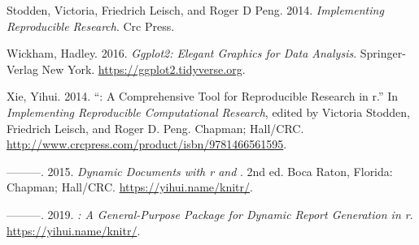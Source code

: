 \begin{CSLReferences}{1}{0}
\leavevmode{}%
Stodden, Victoria, Friedrich Leisch, and Roger D Peng. 2014. \emph{Implementing Reproducible Research}. Crc Press.

\leavevmode{}%
Wickham, Hadley. 2016. \emph{Ggplot2: Elegant Graphics for Data Analysis}. Springer-Verlag New York. \url{https://ggplot2.tidyverse.org}.

\leavevmode{}%
Xie, Yihui. 2014. {``: A Comprehensive Tool for Reproducible Research in r.''} In \emph{Implementing Reproducible Computational Research}, edited by Victoria Stodden, Friedrich Leisch, and Roger D. Peng. Chapman; Hall/CRC. \url{http://www.crcpress.com/product/isbn/9781466561595}.

\leavevmode{}%
---------. 2015. \emph{Dynamic Documents with r and }. 2nd ed. Boca Raton, Florida: Chapman; Hall/CRC. \url{https://yihui.name/knitr/}.

\leavevmode{}%
---------. 2019. \emph{: A General-Purpose Package for Dynamic Report Generation in r}. \url{https://yihui.name/knitr/}.

\end{CSLReferences}



\address{%
Sagiru Mati\\
Near East University\\%
\textsuperscript{1}Operational Research Center in Healthcare\\ Near East University, Nicosia, North Cyprus\\ \textsuperscript{2}Department of Economics\\ Yusuf Maitama Sule University, Nigeria\\
%
\url{https://www.smati.com.ng}\\%
\textit{ORCiD: \href{https://orcid.org/0000-0003-1413-3974}{0000-0003-1413-3974}}\\%
\href{mailto:sagirumati@gmail.com}{\nolinkurl{sagirumati@gmail.com}}%
}

\address{%
Irfan Civcir\\
Ankara University\\%
Department of Economics\\ Ankara, Turkey\\
%
\url{http://cv.ankara.edu.tr/kisi.php?id=civcir@politics.ankara.edu.tr&deger=2}\\%
\textit{ORCiD: \href{https://orcid.org/0000-0002-2557-2625}{0000-0002-2557-2625}}\\%
\href{mailto:civcir@politics.ankara.edu.tr}{\nolinkurl{civcir@politics.ankara.edu.tr}}%
}

